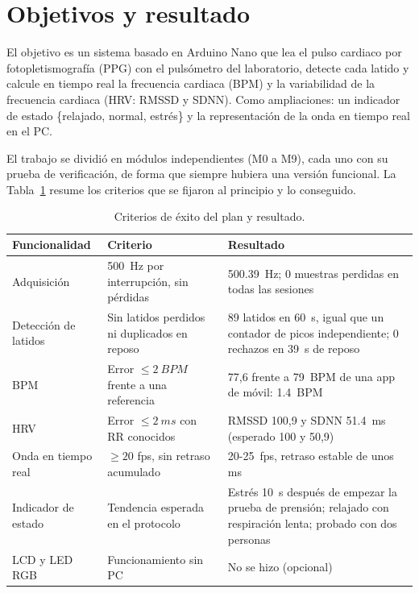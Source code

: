 \documentclass[11pt,a4paper]{article}
\begin{document}
\setcounter{page}{1}
\tableofcontents
\newpage

\section{Objetivos y resultado}

El objetivo es un sistema basado en Arduino Nano que lea el pulso cardiaco por
fotopletismografía (PPG) con el pulsómetro del laboratorio, detecte cada latido y calcule en
tiempo real la frecuencia cardiaca (BPM) y la variabilidad de la frecuencia cardiaca (HRV:
RMSSD y SDNN). Como ampliaciones: un indicador de estado \{relajado, normal, estrés\} y la
representación de la onda en tiempo real en el PC.

El trabajo se dividió en módulos independientes (M0 a M9), cada uno con su prueba de
verificación, de forma que siempre hubiera una versión funcional. La Tabla~\ref{tab:resultado}
resume los criterios que se fijaron al principio y lo conseguido.

\begin{table}[H]
\centering\small
\caption{Criterios de éxito del plan y resultado.}
\label{tab:resultado}
\begin{tabularx}{\textwidth}{lXX}
\toprule
Funcionalidad & Criterio & Resultado \\
\midrule
Adquisición & \qty{500}{Hz} por interrupción, sin pérdidas & \qty{500.39}{Hz}; 0 muestras perdidas en todas las sesiones \\
Detección de latidos & Sin latidos perdidos ni duplicados en reposo & 89 latidos en \qty{60}{s}, igual que un contador de picos independiente; 0 rechazos en \qty{39}{s} de reposo \\
BPM & Error $\le \qty{2}{BPM}$ frente a una referencia & 77,6 frente a \qty{79}{BPM} de una app de móvil: \qty{1.4}{BPM} \\
HRV & Error $\le \qty{2}{ms}$ con RR conocidos & RMSSD 100,9 y SDNN \qty{51.4}{ms} (esperado 100 y 50,9) \\
Onda en tiempo real & $\ge 20$ fps, sin retraso acumulado & 20-\qty{25}{fps}, retraso estable de unos ms \\
Indicador de estado & Tendencia esperada en el protocolo & Estrés \qty{10}{s} después de empezar la prueba de prensión; relajado con respiración lenta; probado con dos personas \\
LCD y LED RGB & Funcionamiento sin PC & No se hizo (opcional) \\
\bottomrule
\end{tabularx}
\end{table}
\end{document}
